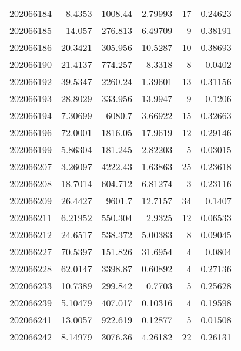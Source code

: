 \begin{tabular}{rrrrrr}
 202066184 &          8.4353  &     1008.44   &            2.79993 &          17 & 0.24623 \\
 202066185 &         14.057   &      276.813  &            6.49709 &           9 & 0.38191 \\
 202066186 &         20.3421  &      305.956  &           10.5287  &          10 & 0.38693 \\
 202066190 &         21.4137  &      774.257  &            8.3318  &           8 & 0.0402  \\
 202066192 &         39.5347  &     2260.24   &            1.39601 &          13 & 0.31156 \\
 202066193 &         28.8029  &      333.956  &           13.9947  &           9 & 0.1206  \\
 202066194 &          7.30699 &     6080.7    &            3.66922 &          15 & 0.32663 \\
 202066196 &         72.0001  &     1816.05   &           17.9619  &          12 & 0.29146 \\
 202066199 &          5.86304 &      181.245  &            2.82203 &           5 & 0.03015 \\
 202066207 &          3.26097 &     4222.43   &            1.63863 &          25 & 0.23618 \\
 202066208 &         18.7014  &      604.712  &            6.81274 &           3 & 0.23116 \\
 202066209 &         26.4427  &     9601.7    &           12.7157  &          34 & 0.1407  \\
 202066211 &          6.21952 &      550.304  &            2.9325  &          12 & 0.06533 \\
 202066212 &         24.6517  &      538.372  &            5.00383 &           8 & 0.09045 \\
 202066227 &         70.5397  &      151.826  &           31.6954  &           4 & 0.0804  \\
 202066228 &         62.0147  &     3398.87   &            0.60892 &           4 & 0.27136 \\
 202066233 &         10.7389  &      299.842  &            0.7703  &           5 & 0.25628 \\
 202066239 &          5.10479 &      407.017  &            0.10316 &           4 & 0.19598 \\
 202066241 &         13.0057  &      922.619  &            0.12877 &           5 & 0.01508 \\
 202066242 &          8.14979 &     3076.36   &            4.26182 &          22 & 0.26131 \\

\end{tabular}
